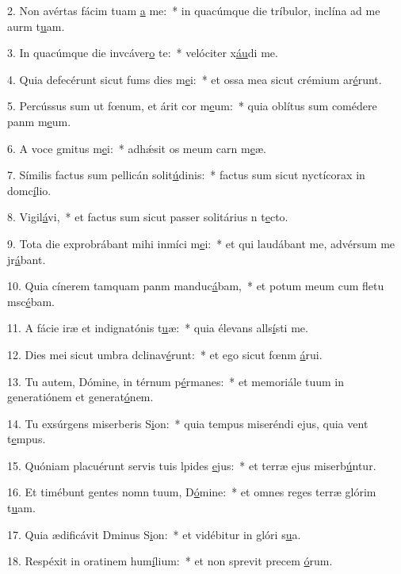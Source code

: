 2. Non avértas fácim tuam \uline{a} me:~* in quacúmque die tríbulor, inclína ad me aurm t\uline{u}am.\par 
3. In quacúmque die invcáver\uline{o} te:~* velóciter x\uline{áu}di me.\par 
4. Quia defecérunt sicut fums dies m\uline{e}i:~* et ossa mea sicut crémium ar\uline{é}runt.\par 
5. Percússus sum ut fœnum, et árit cor m\uline{e}um:~* quia oblítus sum comédere panm m\uline{e}um.\par 
6. A voce gmitus m\uline{e}i:~* adhǽsit os meum carn m\uline{e}æ.\par 
7. Símilis factus sum pellicán solit\uline{ú}dinis:~* factus sum sicut nyctícorax in domc\uline{í}lio.\par 
8. Vigil\uline{á}vi,~* et factus sum sicut passer solitárius n t\uline{e}cto.\par 
9. Tota die exprobrábant mihi inmíci m\uline{e}i:~* et qui laudábant me, advérsum me jr\uline{á}bant.\par 
10. Quia cínerem tamquam panm manduc\uline{á}bam,~* et potum meum cum fletu msc\uline{é}bam.\par 
11. A fácie iræ et indignatónis t\uline{u}æ:~* quia élevans alls\uline{í}sti me.\par 
12. Dies mei sicut umbra dclinav\uline{é}runt:~* et ego sicut fœnm \uline{á}rui.\par 
13. Tu autem, Dómine, in térnum p\uline{é}rmanes:~* et memoriále tuum in generatiónem et generat\uline{ó}nem.\par 
14. Tu exsúrgens miserberis S\uline{i}on:~* quia tempus miseréndi ejus, quia vent t\uline{e}mpus.\par 
15. Quóniam placuérunt servis tuis lpides \uline{e}jus:~* et terræ ejus miserb\uline{ú}ntur.\par 
16. Et timébunt gentes nomn tuum, D\uline{ó}mine:~* et omnes reges terræ glórim t\uline{u}am.\par 
17. Quia ædificávit Dminus S\uline{i}on:~* et vidébitur in glóri s\uline{u}a.\par 
18. Respéxit in oratinem hum\uline{í}lium:~* et non sprevit precem \uline{ó}rum.\par 
